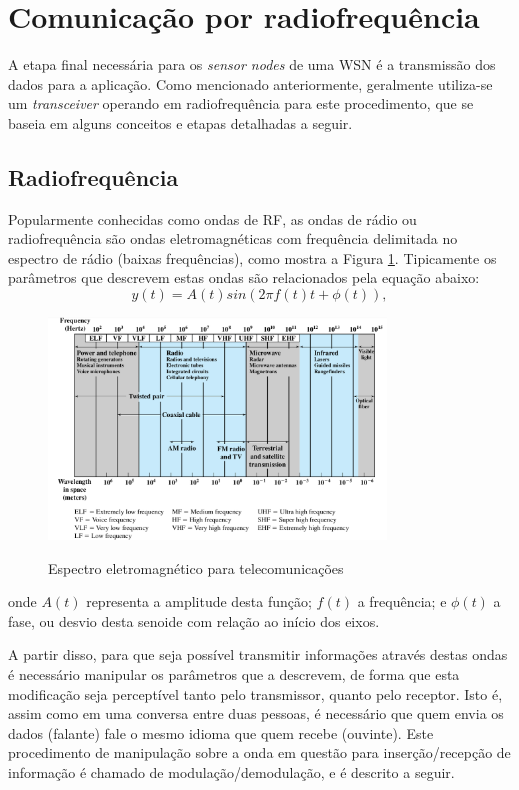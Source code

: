 \documentclass[oneside,openright,12pt]{ufsm_2015} %
\begin{document}
\section{Comunicação por radiofrequência}
A etapa final necessária para os \textit{sensor nodes} de uma WSN é a transmissão dos dados para a aplicação. Como mencionado anteriormente, geralmente utiliza-se um \textit{transceiver} operando em radiofrequência para este procedimento, que se baseia em alguns conceitos e etapas detalhadas a seguir.

\subsection{Radiofrequência}
Popularmente conhecidas como ondas de RF, as ondas de rádio ou radiofrequência são ondas eletromagnéticas com frequência delimitada no espectro de rádio (baixas frequências), como mostra a Figura \ref{fig:espectro}. Tipicamente os parâmetros que descrevem estas ondas são relacionados pela equação abaixo:
\begin{equation}
    y(t) = A(t)sin(2\pi f(t)t + \phi (t)),
\end{equation}

\begin{figure}[ht]
     \caption{\label{exepretex} Espectro eletromagnético para telecomunicações}
\centering
\includegraphics[width=0.8\textwidth]{figuras/espectro.png}
\vspace{\baselineskip} %
    \label{fig:espectro}
\end{figure}


onde $A(t)$ representa a amplitude desta função; $f(t)$ a frequência; e $\phi (t)$ a fase, ou desvio desta senoide com relação ao início dos eixos.

A partir disso, para que seja possível transmitir informações através destas ondas é necessário manipular os parâmetros que a descrevem, de forma que esta modificação seja perceptível tanto pelo transmissor, quanto pelo receptor. Isto é, assim como em uma conversa entre duas pessoas, é necessário que quem envia os dados (falante) fale o mesmo idioma que quem recebe (ouvinte). Este procedimento de manipulação sobre a onda em questão para inserção/recepção de informação é chamado de modulação/demodulação, e é descrito a seguir.
\end{document}
